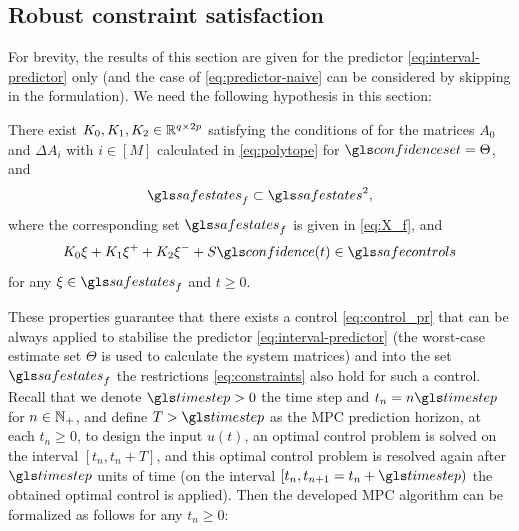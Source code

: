 \subsection{Robust constraint satisfaction}
\label{sec:stab-robust-control}

For brevity, the results of this section are given for the predictor
\eqref{eq:interval-predictor} only (and the case of \eqref{eq:predictor-naive}
can be considered by skipping  in the
formulation). We need the following hypothesis in this section:
\begin{assumption}
	\begin{leftbar}[assumptionbar]
	\label{assumpt:feasible-constr} There exist $K_{0},K_{1},K_{2}\in\mathbb{R}^{q\times2p}$	satisfying the conditions of  for the matrices $A_{0}$ and $\Delta A_{i}$ with $i\in[M]$ calculated in \eqref{eq:polytope}	for $\confidenceset=\Theta$, and
	\[
	\safestates_{f}\subset\safestates^{2},
	\]
	where the corresponding set $\safestates_{f}$ is given in \eqref{eq:X_f}, and
	\[
	K_{0}\xi+K_{1}\xi^{+}+K_{2}\xi^{-}+S\confidence(t)\in\safecontrols
	\]
	for any $\xi\in\safestates_{f}$ and $t\geq0$.
	\end{leftbar}
\end{assumption}
These properties guarantee that there exists a control \eqref{eq:control_pr} that can be always applied to stabilise the predictor \eqref{eq:interval-predictor}
(the worst-case estimate set $\Theta$ is used to calculate the system matrices) and into the set $\safestates_{f}$ the restrictions \eqref{eq:constraints} also hold for such a control. Recall that we denote $\timestep>0$ the time step and $t_{n}=n\timestep$ for $n\in\mathbb{N}_{+}$, and define $T>\timestep $ as the \gls{MPC} prediction horizon, \ie at each $t_n\geq0$, to design
the input $u(t)$, an optimal control problem is solved on the interval $[t_n,t_n+T]$, and this optimal control problem is resolved again after $\timestep$ units of time (on the interval $[t_n,t_{n+1} = t_n+\timestep)$ the obtained
optimal control is applied). Then the developed \gls{MPC} algorithm can be formalized as follows for
any $t_{n}\geq0$:

